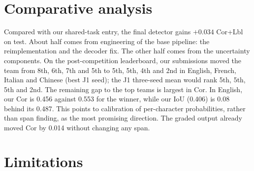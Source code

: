 \section{Comparative analysis}

Compared with our shared-task entry, the final detector gains $+0.034$ Cor+Lbl on test. About half comes from engineering of the base pipeline: the reimplementation and the decoder fix. The other half comes from the uncertainty components. On the post-competition leaderboard, our submissions moved the team from 8th, 6th, 7th and 5th to 5th, 5th, 4th and 2nd in English, French, Italian and Chinese (best J1 seed); the J1 three-seed mean would rank 5th, 5th, 5th and 2nd. The remaining gap to the top teams is largest in Cor. In English, our Cor is 0.456 against 0.553 for the winner, while our IoU (0.406) is 0.08 behind its 0.487. This points to calibration of per-character probabilities, rather than span finding, as the most promising direction. The graded output already moved Cor by 0.014 without changing any span.

\section{Limitations}

